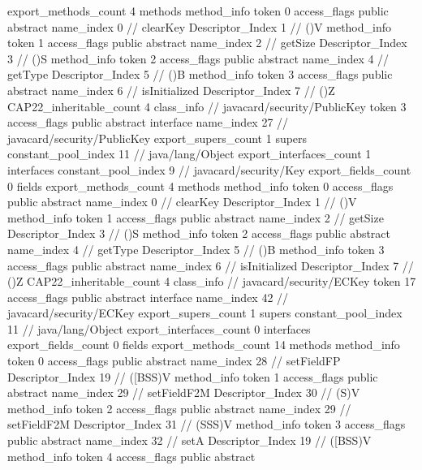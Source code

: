 {{{			export_methods_count	4
			methods {
				method_info {
					token	0
					access_flags	public abstract
					name_index	0		// clearKey
					Descriptor_Index	1		// ()V
				}
				method_info {
					token	1
					access_flags	public abstract
					name_index	2		// getSize
					Descriptor_Index	3		// ()S
				}
				method_info {
					token	2
					access_flags	public abstract
					name_index	4		// getType
					Descriptor_Index	5		// ()B
				}
				method_info {
					token	3
					access_flags	public abstract
					name_index	6		// isInitialized
					Descriptor_Index	7		// ()Z
				}
			}
			CAP22_inheritable_count	4
		}
		class_info {		// javacard/security/PublicKey
			token	3
			access_flags	public abstract interface
			name_index	27		// javacard/security/PublicKey
			export_supers_count	1
			supers {
				constant_pool_index	11		// java/lang/Object
			}
			export_interfaces_count	1
			interfaces {
				constant_pool_index	9		// javacard/security/Key
			}
			export_fields_count	0
			fields {
			}
			export_methods_count	4
			methods {
				method_info {
					token	0
					access_flags	public abstract
					name_index	0		// clearKey
					Descriptor_Index	1		// ()V
				}
				method_info {
					token	1
					access_flags	public abstract
					name_index	2		// getSize
					Descriptor_Index	3		// ()S
				}
				method_info {
					token	2
					access_flags	public abstract
					name_index	4		// getType
					Descriptor_Index	5		// ()B
				}
				method_info {
					token	3
					access_flags	public abstract
					name_index	6		// isInitialized
					Descriptor_Index	7		// ()Z
				}
			}
			CAP22_inheritable_count	4
		}
		class_info {		// javacard/security/ECKey
			token	17
			access_flags	public abstract interface
			name_index	42		// javacard/security/ECKey
			export_supers_count	1
			supers {
				constant_pool_index	11		// java/lang/Object
			}
			export_interfaces_count	0
			interfaces {
			}
			export_fields_count	0
			fields {
			}
			export_methods_count	14
			methods {
				method_info {
					token	0
					access_flags	public abstract
					name_index	28		// setFieldFP
					Descriptor_Index	19		// ([BSS)V
				}
				method_info {
					token	1
					access_flags	public abstract
					name_index	29		// setFieldF2M
					Descriptor_Index	30		// (S)V
				}
				method_info {
					token	2
					access_flags	public abstract
					name_index	29		// setFieldF2M
					Descriptor_Index	31		// (SSS)V
				}
				method_info {
					token	3
					access_flags	public abstract
					name_index	32		// setA
					Descriptor_Index	19		// ([BSS)V
				}
				method_info {
					token	4
					access_flags	public abstract
}}}}}
